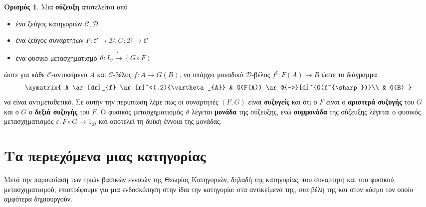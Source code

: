 \documentclass [a4paper,11pt] {book}
\theoremstyle{definition}
\theoremstyle{definition}
\newtheorem{definition}[theorem]{Ορισμός}
\begin{document}
\begin{definition}\label{adjunction}
Μια \textbf{σύζευξη} αποτελείται από
\begin{itemize}
\item ένα ζεύγος κατηγοριών $\mathcal{C},\mathcal{D}$
\item ένα ζεύγος συναρτητών $F:\mathcal{C}\to \mathcal{D},G:\mathcal{D}\to \mathcal{C}$
\item ένα φυσικό μετασχηματισμό $\vartheta : I_{\mathcal{C}}\dot{\to} (G\circ F)$
\end{itemize}
ώστε για κάθε $\mathcal{C}$-αντικείμενο $A$ και $\mathcal{C}$-βέλος $f:A\to G(B)$, να υπάρχει μοναδικό $\mathcal{D}$-βέλος $f^{\sharp}:F(A)\to B$ ώστε το διάγραμμα
\begin{displaymath}
\xymatrix{
A \ar[dr]_{f}  \ar[r]^<(.2){\vartheta_{A}} & G(F(A)) \ar@{-->}[d]^{G(f^{\sharp})}\\
& G(B)
}
\end{displaymath}
να είναι αντιμεταθετικό. Σε αυτήν την περίπτωση λέμε πως οι συναρτητές $(F,G)$ είναι \textbf{συζυγείς} και ότι ο $F$ είναι ο \textbf{αριστερά συζυγής} του $G$ και ο $G$ ο \textbf{δεξιά συζυγής} του $F$. Ο φυσικός μετασχηματισμός $\vartheta$ λέγεται \textbf{μονάδα} της σύζευξης, ενώ \textbf{συμμονάδα} της σύζευξης λέγεται ο φυσικός μετασχηματισμός $\varepsilon: F\circ G \to 1_{\mathcal{D}}$ και αποτελεί τη δυϊκή έννοια της μονάδας.
\end{definition}

\section{Τα περιεχόμενα μιας κατηγορίας}
Μετά την παρουσίαση των τριών βασικών εννοιών της Θεωρίας Κατηγοριών, δηλαδή της κατηγορίας, του συναρτητή και του φυσικού μετασχηματισμού, επιστρέφουμε για μια ενδοσκόπηση στην ίδια την κατηγορία: στα αντικείμενά της, στα βέλη της και στον κόσμο τον οποίο αμφότερα δημιουργούν.
\end{document}
